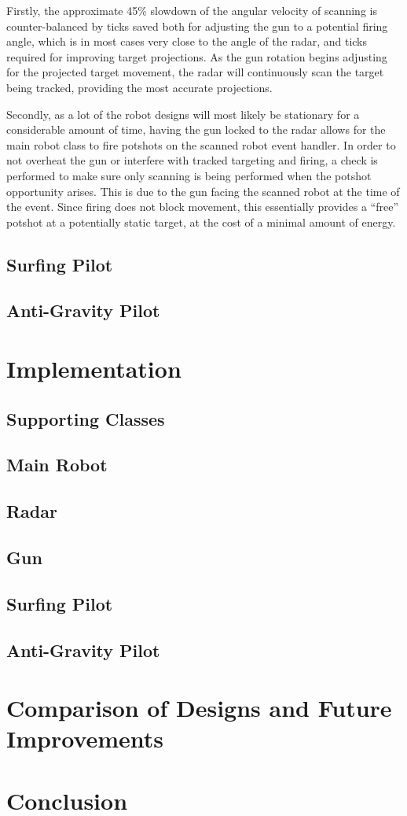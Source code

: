 \documentclass[11pt]{report}
\begin{document}
Firstly, the approximate 45\% slowdown of the angular velocity of scanning is counter-balanced by ticks saved both for adjusting the gun to a potential firing angle, which is in most cases very close to the angle of the radar, and ticks required for improving target projections. As the gun rotation begins adjusting for the projected target movement, the radar will continuously scan the target being tracked, providing the most accurate projections.

Secondly, as a lot of the robot designs will most likely be stationary for a considerable amount of time, having the gun locked to the radar allows for the main robot class to fire potshots on the scanned robot event handler. In order to not overheat the gun or interfere with tracked targeting and firing, a check is performed to make sure only scanning is being performed when the potshot opportunity arises. This is due to the gun facing the scanned robot at the time of the event. Since firing does not block movement, this essentially provides a ``free'' potshot at a potentially static target, at the cost of a minimal amount of energy.

\section{Surfing Pilot}
\section{Anti-Gravity Pilot}

\chapter{Implementation} %
\section{Supporting Classes}
\section{Main Robot}
\section{Radar}
\section{Gun}
\section{Surfing Pilot}
\section{Anti-Gravity Pilot}

\chapter{Comparison of Designs and Future Improvements}

\chapter{Conclusion} %

\nocite{*}
\printbibliography
\end{document}
